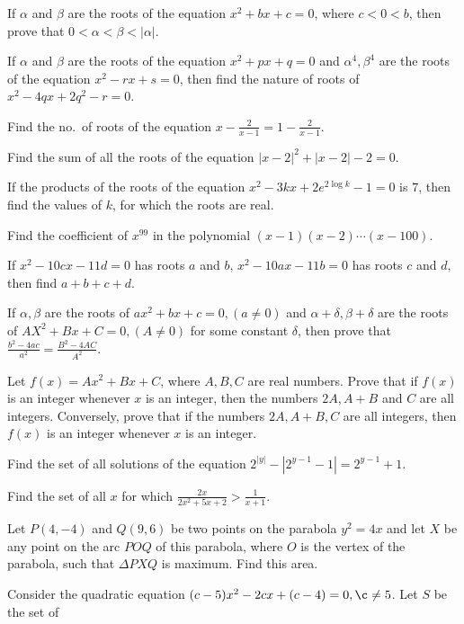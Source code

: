 \item If $\alpha$ and $\beta$ are the roots of the equation $x^2 + bx + c = 0$, where $c < 0 < b$, then
  prove that $0 < \alpha < \beta < |\alpha|$.
\item If $\alpha$ and $\beta$ are the roots of the equation $x^2 + px + q = 0$ and $\alpha^4, \beta^4$ are
  the roots of the equation $x^2 - rx + s = 0$, then find the nature of roots of $x^2 - 4qx + 2q^2 - r = 0$.
\item Find the no.\ of roots of the equation $x - \frac{2}{x - 1} = 1 - \frac{2}{x - 1}$.
\item Find the sum of all the roots of the equation $|x - 2|^2 + |x - 2| - 2 = 0$.
\item If the products of the roots of the equation $x^2 - 3kx + 2e^{2\log k} - 1 = 0$ is $7$, then find the
  values of $k$, for which the roots are real.
\item Find the coefficient of $x^{99}$ in the polynomial $(x - 1)(x - 2) \cdots (x - 100)$.
\item If $x^2 - 10cx - 11d = 0$ has roots $a$ and $b$, $x^2 - 10ax - 11b = 0$ has roots $c$ and $d$, then
  find $a + b + c + d$.
\item If $\alpha, \beta$ are the roots of $ax^2 + bx + c = 0, (a\neq 0)$ and $\alpha + \delta, \beta
  + \delta$ are the roots of $AX^2 + Bx + C = 0, (A\neq 0)$ for some constant $\delta$, then prove that
  $\frac{b^2 - 4ac}{a^2} = \frac{B^2 - 4AC}{A^2}$.
\item Let $f(x) = Ax^2 + Bx + C$, where $A, B, C$ are real numbers. Prove that if $f(x)$ is an integer
  whenever $x$ is an integer, then the numbers $2A, A + B$ and $C$ are all integers. Conversely, prove that
  if the numbers $2A, A + B, C$ are all integers, then $f(x)$ is an integer whenever $x$ is an integer.
\item Find the set of all solutions of the equation $2^{|y|} - \left|2^{y - 1} - 1\right| = 2^{y - 1} + 1$.
\item Find the set of all $x$ for which $\frac{2x}{2x^2 + 5x + 2} > \frac{1}{x + 1}$.
\item Let $P(4, -4)$ and $Q(9, 6)$ be two points on the parabola $y^2 = 4x$ and let $X$ be any point on the
  arc $POQ$ of this parabola, where $O$ is the vertex of the parabola, such that $\Delta PXQ$ is
  maximum. Find this area.
\item Consider the quadratic equation $(c - 5)x^2 - 2cx + (c - 4) = 0, \c\neq 5$. Let $S$ be the set of
